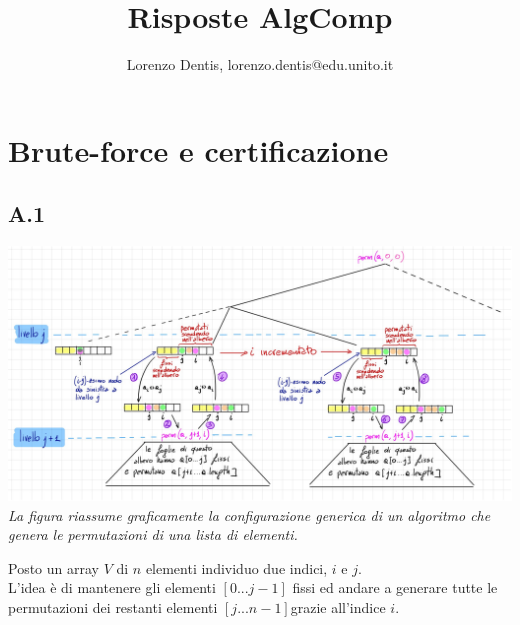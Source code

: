 \documentclass[a4paper]{article}
\begin{document}
\author{Lorenzo Dentis, lorenzo.dentis@edu.unito.it}
\title{Risposte AlgComp}
\maketitle

\tableofcontents

\section{Brute-force e certificazione}
\subsection{A.1}
\includegraphics[width=\textwidth]{./img/A1}
\emph{La figura riassume graficamente la configurazione generica di un algoritmo che genera le permutazioni di una lista di elementi.}


Posto un array $V$ di $n$ elementi individuo due indici, $i$ e $j$.\\L'idea è di mantenere gli elementi $[0 ... j-1]$ fissi ed andare a generare tutte le permutazioni dei restanti elementi $[j ... n-1]$grazie all'indice $i$.
\end{document}
